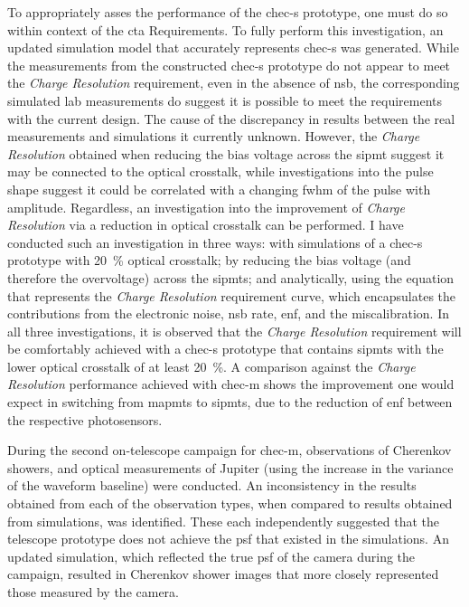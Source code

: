To appropriately asses the performance of the \gls{chec-s} prototype, one must do so within context of the \gls{cta} Requirements. To fully perform this investigation, an updated simulation model that accurately represents \gls{chec-s} was generated. While the measurements from the constructed \gls{chec-s} prototype do not appear to meet the \textit{Charge Resolution} requirement, even in the absence of \gls{nsb}, the corresponding simulated lab measurements do suggest it is possible to meet the requirements with the current design. The cause of the discrepancy in results between the real measurements and simulations it currently unknown. However, the \textit{Charge Resolution} obtained when reducing the bias voltage across the \gls{sipmt} suggest it may be connected to the optical crosstalk, while investigations into the pulse shape suggest it could be correlated with a changing \gls{fwhm} of the pulse with amplitude. Regardless, an investigation into the improvement of \textit{Charge Resolution} via a reduction in optical crosstalk can be performed. I have conducted such an investigation in three ways: with simulations of a \gls{chec-s} prototype with \SI{20}{\percent} optical crosstalk; by reducing the bias voltage (and therefore the overvoltage) across the \glspl{sipmt}; and analytically, using the equation that represents the \textit{Charge Resolution} requirement curve, which encapsulates the contributions from the electronic noise, \gls{nsb} rate, \gls{enf}, and the miscalibration. In all three investigations, it is observed that the \textit{Charge Resolution} requirement will be comfortably achieved with a \gls{chec-s} prototype that contains \glspl{sipmt} with the lower optical crosstalk of at least \SI{20}{\percent}. A comparison against the \textit{Charge Resolution} performance achieved with \gls{chec-m} shows the improvement one would expect in switching from \glspl{mapmt} to \glspl{sipmt}, due to the reduction of \gls{enf} between the respective photosensors.

During the second on-telescope campaign for \gls{chec-m}, observations of Cherenkov showers, and optical measurements of Jupiter (using the increase in the variance of the waveform baseline) were conducted. An inconsistency in the results obtained from each of the observation types, when compared to results obtained from simulations, was identified. These each independently suggested that the telescope prototype does not achieve the \gls{psf} that existed in the simulations. An updated simulation, which reflected the true \gls{psf} of the camera during the campaign, resulted in Cherenkov shower images that more closely represented those measured by the camera. 
 
